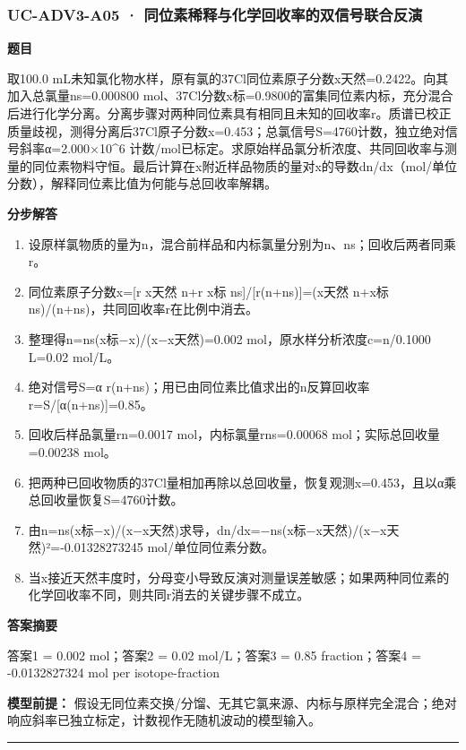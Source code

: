 \documentclass[UTF8,11pt,a4paper]{ctexart}
\begin{document}
\subsubsection*{UC-ADV3-A05 · 同位素稀释与化学回收率的双信号联合反演}
\noindent\textbf{题目}\par
取100.0 mL未知氯化物水样，原有氯的37Cl同位素原子分数x天然=0.2422。向其加入总氯量ns=0.000800 mol、37Cl分数x标=0.9800的富集同位素内标，充分混合后进行化学分离。分离步骤对两种同位素具有相同且未知的回收率r。质谱已校正质量歧视，测得分离后37Cl原子分数x=0.453；总氯信号S=4760计数，独立绝对信号斜率α=2.000×10\textasciicircum{}6 计数/mol已标定。求原始样品氯分析浓度、共同回收率与测量的同位素物料守恒。最后计算在x附近样品物质的量对x的导数dn/dx（mol/单位分数），解释同位素比值为何能与总回收率解耦。\par
\medskip\noindent\textbf{分步解答}
\begin{enumerate}
\item 设原样氯物质的量为n，混合前样品和内标氯量分别为n、ns；回收后两者同乘r。
\item 同位素原子分数x=[r x天然 n+r x标 ns]/[r(n+ns)]=(x天然 n+x标 ns)/(n+ns)，共同回收率r在比例中消去。
\item 整理得n=ns(x标−x)/(x−x天然)=0.002 mol，原水样分析浓度c=n/0.1000 L=0.02 mol/L。
\item 绝对信号S=α r(n+ns)；用已由同位素比值求出的n反算回收率r=S/[α(n+ns)]=0.85。
\item 回收后样品氯量rn=0.0017 mol，内标氯量rns=0.00068 mol；实际总回收量=0.00238 mol。
\item 把两种已回收物质的37Cl量相加再除以总回收量，恢复观测x=0.453，且以α乘总回收量恢复S=4760计数。
\item 由n=ns(x标−x)/(x−x天然)求导，dn/dx=−ns(x标−x天然)/(x−x天然)²=-0.01328273245 mol/单位同位素分数。
\item 当x接近天然丰度时，分母变小导致反演对测量误差敏感；如果两种同位素的化学回收率不同，则共同r消去的关键步骤不成立。
\end{enumerate}
\noindent\textbf{答案摘要}\par
答案1 = 0.002 mol；答案2 = 0.02 mol/L；答案3 = 0.85 fraction；答案4 = -0.0132827324 mol per isotope-fraction\par
\noindent\textbf{模型前提：}
假设无同位素交换/分馏、无其它氯来源、内标与原样完全混合；绝对响应斜率已独立标定，计数视作无随机波动的模型输入。\par
\medskip\hrule\medskip
{}
\end{document}
